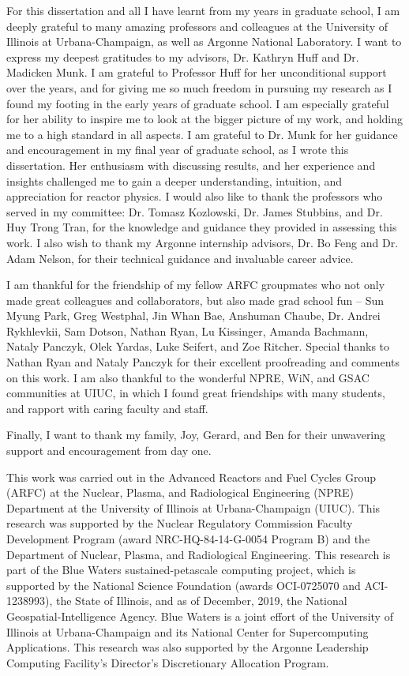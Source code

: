 For this dissertation and all I have learnt from my years in graduate school, 
I am deeply grateful to many amazing professors and colleagues at the University of 
Illinois at Urbana-Champaign, as well as Argonne National Laboratory. 
I want to express my deepest gratitudes to my advisors, Dr. Kathryn Huff and Dr. 
Madicken Munk. 
I am grateful to Professor Huff for her unconditional support over the years, and for 
giving me so much freedom in pursuing my research as I found my footing in the early 
years of graduate school. 
I am especially grateful for her ability to inspire me to look at the bigger picture of 
my work, and holding me to a high standard in all aspects.
I am grateful to Dr. Munk for her guidance and encouragement in my final year 
of graduate school, as I wrote this dissertation. 
Her enthusiasm with discussing results, and her experience and insights challenged me to 
gain a deeper understanding, intuition, and appreciation for reactor physics.  
I would also like to thank the professors who served in my committee: Dr. Tomasz 
Kozlowski, Dr. James Stubbins, and Dr. Huy Trong Tran, for the knowledge and guidance 
they provided in assessing this work. 
I also wish to thank my Argonne internship advisors, Dr. Bo Feng and Dr. Adam Nelson, 
for their technical guidance and invaluable career advice. 

I am thankful for the friendship of my fellow ARFC 
groupmates who not only made great colleagues and collaborators, but also made 
grad school fun -- Sun Myung Park, Greg Westphal, Jin Whan Bae, Anshuman Chaube, 
Dr. Andrei Rykhlevkii, Sam Dotson, Nathan Ryan, Lu Kissinger, Amanda Bachmann, 
Nataly Panczyk, Olek Yardas, Luke Seifert, and Zoe Ritcher. 
Special thanks to Nathan Ryan and Nataly Panczyk for their excellent proofreading 
and comments on this work. 
I am also thankful to the wonderful NPRE, WiN, and GSAC communities at UIUC, in which 
I found great friendships with many students, and rapport with caring faculty and staff. 

Finally, I want to thank my family, Joy, Gerard, and Ben for their unwavering support 
and encouragement from day one. 

This work was carried out in the Advanced Reactors and Fuel Cycles Group (ARFC) at the 
Nuclear, Plasma, and Radiological Engineering (NPRE) Department at the University of 
Illinois at Urbana-Champaign (UIUC). 
This research was supported by the Nuclear Regulatory Commission Faculty Development 
Program (award NRC-HQ-84-14-G-0054 Program B) and the Department of Nuclear, Plasma, 
and Radiological Engineering.
This research is part of the Blue Waters sustained-petascale computing project, 
which is supported by the National Science Foundation (awards OCI-0725070 and 
ACI-1238993), the State of Illinois, and as of December, 2019, the National 
Geospatial-Intelligence Agency. 
Blue Waters is a joint effort of the University of Illinois at Urbana-Champaign and 
its National Center for Supercomputing Applications.
This research was also supported by the Argonne Leadership Computing Facility's 
Director's Discretionary Allocation Program. 